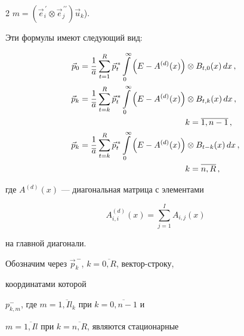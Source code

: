 \begin{multicols}{2}
$m=(\vec e^{\,\prime}_i\otimes \vec e^{\,\prime\prime}_j)\vec u_k$).


Эти формулы имеют следующий вид:





\noindent


\begin{align}


\vec p_{0}  & = \frac{1}{\overline a} \sum\limits_{t=1}^{R} \vec p_t^{\,*} 


\int\limits_0^\infty


\left ( E-A^{(d)}(x)\right ) \otimes B_{t,0}(x)\, dx\,,\\


\vec p_{k} & = \frac{1}{\overline a} \sum\limits_{t=k}^{R} \vec p_t^{\,*} 


\int\limits_0^\infty


\left ( E-A^{(d)}(x)\right ) \otimes B_{t,k}(x)\, dx\,,\notag\\


&\ \ \ \ \ \ \ \ \ \ \ \ \ \ \ \ \ \ \ \ \ \ \ \ \ \ \ \ \ \ \ \ \ \ \ \ \ \  k =\overline{1,n-1}\,,\\


\label{p_3} \vec p_{k} & = \frac{1}{\overline a} \sum\limits_{t=k}^{R} \vec 


p_t^{\,*} \int\limits_0^\infty


\left ( E-A^{(d)}(x)\right ) \otimes B_{t-k}(x)\, dx\,,\notag\\


&\ \ \ \ \ \ \ \ \ \ \ \ \ \ \ \ \ \ \ \ \ \ \ \ \ \ \ \ \ \ \ \ \ \ \ \ \ \ k= \overline{n,R}\,,


\end{align}


где $A^{(d)}(x)$ --- диагональная матрица с элементами


$$


A_{i,i}^{(d)}(x) = \sum\limits_{j=1}^I A_{i,j}(x)


$$


на главной диагонали.





Обозначим через $\vec p_k^{\,-}$, $k=\overline{0,R}$, вектор-строку,


координатами которой


$p_{k,m}^{-}$, где $m=\overline{1,I l_k}$ при $k=\overline{0,n-1}$ и


$m=\overline{1,Il}$ при $k=\overline{n,R}$, являются стационарные



\end{multicols}
